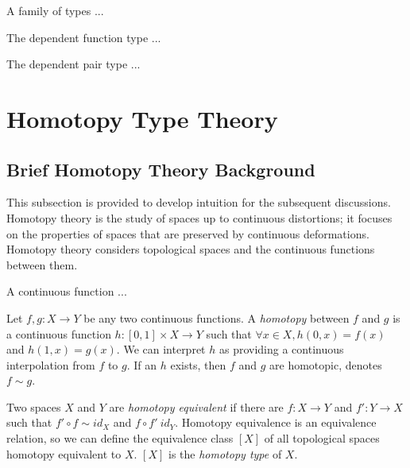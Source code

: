\documentclass{article}
\begin{document}
\begin{definition}
  A family of types ...
\end{definition}

\begin{definition}
  The dependent function type ...
\end{definition}

\begin{definition}
  The dependent pair type ...
\end{definition}

\section{Homotopy Type Theory}

\subsection{Brief Homotopy Theory Background}

This subsection is provided to develop intuition for the subsequent discussions. Homotopy theory is the study of spaces up to continuous distortions; it focuses on the properties of spaces that are preserved by continuous deformations. Homotopy theory considers topological spaces and the continuous functions between them.

\begin{definition}
 A continuous function ...
\end{definition}

\begin{definition}
  Let $f, g : X \to Y$ be any two continuous functions. A \emph{homotopy} between $f$ and $g$ is a continuous function $h : [0, 1] \times X \to Y$ such that $\forall x \in X, h(0, x) = f(x)$ and $h(1, x) = g(x)$. We can interpret $h$ as providing a continuous interpolation from $f$ to $g$. If an $h$ exists, then $f$ and $g$ are homotopic, denotes $f \sim g$.
\end{definition}


\begin{definition}
  Two spaces $X$ and $Y$ are \emph{homotopy equivalent} if there are $f : X \to Y$ and $f' : Y \to X$ such that $f' \circ f \sim id_{X}$ and $f \circ f' ~ id_{Y}$. Homotopy equivalence is an equivalence relation, so we can define the equivalence class $[X]$ of all topological spaces homotopy equivalent to $X$. $[X]$ is the \emph{homotopy type} of $X$.
\end{definition}
\end{document}
